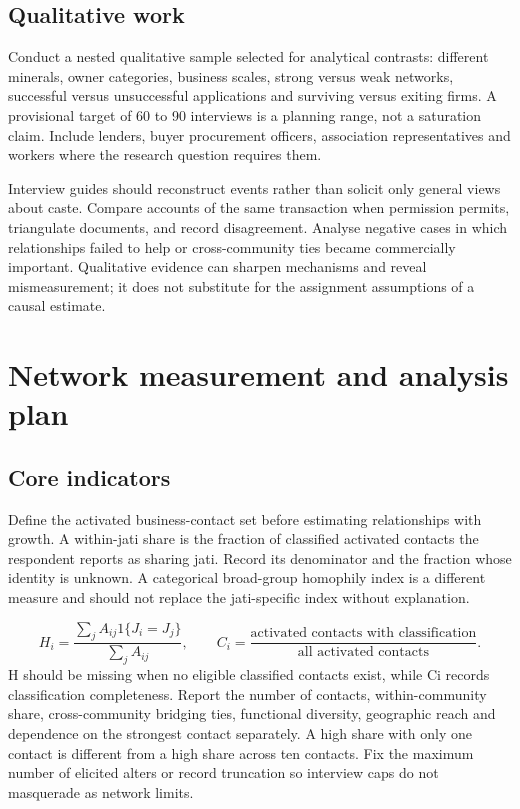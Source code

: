 \documentclass[11pt,a4paper]{report}
\begin{document}
\section{Qualitative work}
Conduct a nested qualitative sample selected for analytical contrasts: different minerals, owner categories, business scales, strong versus weak networks, successful versus unsuccessful applications and surviving versus exiting firms. A provisional target of 60 to 90 interviews is a planning range, not a saturation claim. Include lenders, buyer procurement officers, association representatives and workers where the research question requires them.

Interview guides should reconstruct events rather than solicit only general views about caste. Compare accounts of the same transaction when permission permits, triangulate documents, and record disagreement. Analyse negative cases in which relationships failed to help or cross-community ties became commercially important. Qualitative evidence can sharpen mechanisms and reveal mismeasurement; it does not substitute for the assignment assumptions of a causal estimate.

\chapter{Network measurement and analysis plan}
\section{Core indicators}
Define the activated business-contact set before estimating relationships with growth. A within-jati share is the fraction of classified activated contacts the respondent reports as sharing jati. Record its denominator and the fraction whose identity is unknown. A categorical broad-group homophily index is a different measure and should not replace the jati-specific index without explanation.

\[
H_i=\frac{\sum_j A_{ij}1\{J_i=J_j\}}{\sum_j A_{ij}},\qquad
C_i=\frac{\text{activated contacts with classification}}{\text{all activated contacts}}.
\]
H should be missing when no eligible classified contacts exist, while Ci records classification completeness. Report the number of contacts, within-community share, cross-community bridging ties, functional diversity, geographic reach and dependence on the strongest contact separately. A high share with only one contact is different from a high share across ten contacts. Fix the maximum number of elicited alters or record truncation so interview caps do not masquerade as network limits.
\end{document}

